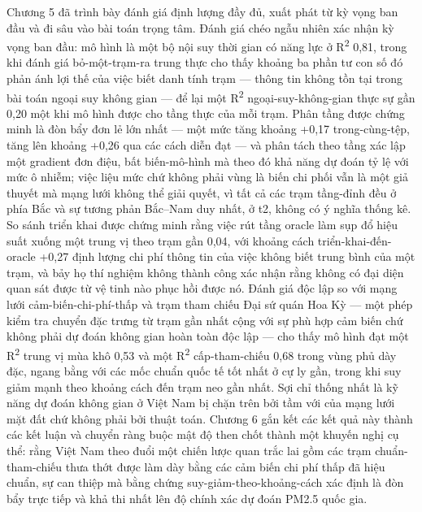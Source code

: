 Chương 5 đã trình bày đánh giá định lượng đầy đủ, xuất phát từ kỳ vọng ban đầu và đi sâu vào bài toán trọng tâm. Đánh giá chéo ngẫu nhiên xác nhận kỳ vọng ban đầu: mô hình là một bộ nội suy thời gian có năng lực ở R\textsuperscript{2} 0,81, trong khi đánh giá bỏ-một-trạm-ra trung thực cho thấy khoảng ba phần tư con số đó phản ánh lợi thế của việc biết danh tính trạm --- thông tin không tồn tại trong bài toán ngoại suy không gian --- để lại một R\textsuperscript{2} ngoại-suy-không-gian thực sự gần 0,20 một khi mô hình được cho tầng thực của mỗi trạm. Phân tầng được chứng minh là đòn bẩy đơn lẻ lớn nhất --- một mức tăng khoảng +0,17 trong-cùng-tệp, tăng lên khoảng +0,26 qua các cách diễn đạt --- và phân tách theo tầng xác lập một gradient đơn điệu, bất biến-mô-hình mà theo đó khả năng dự đoán tỷ lệ với mức ô nhiễm; việc liệu mức chứ không phải vùng là biến chi phối vẫn là một giả thuyết mà mạng lưới không thể giải quyết, vì tất cả các trạm tầng-đỉnh đều ở phía Bắc và sự tương phản Bắc--Nam duy nhất, ở t2, không có ý nghĩa thống kê. So sánh triển khai được chứng minh rằng việc rút tầng oracle làm sụp đổ hiệu suất xuống một trung vị theo trạm gần 0,04, với khoảng cách triển-khai-đến-oracle +0,27 định lượng chi phí thông tin của việc không biết trung bình của một trạm, và bảy họ thí nghiệm không thành công xác nhận rằng không có đại diện quan sát được từ vệ tinh nào phục hồi được nó. Đánh giá độc lập so với mạng lưới cảm-biến-chi-phí-thấp và trạm tham chiếu Đại sứ quán Hoa Kỳ --- một phép kiểm tra chuyển đặc trưng từ trạm gần nhất cộng với sự phù hợp cảm biến chứ không phải dự đoán không gian hoàn toàn độc lập --- cho thấy mô hình đạt một R\textsuperscript{2} trung vị mùa khô 0,53 và một R\textsuperscript{2} cấp-tham-chiếu 0,68 trong vùng phủ dày đặc, ngang bằng với các mốc chuẩn quốc tế tốt nhất ở cự ly gần, trong khi suy giảm mạnh theo khoảng cách đến trạm neo gần nhất. Sợi chỉ thống nhất là kỹ năng dự đoán không gian ở Việt Nam bị chặn trên bởi tầm với của mạng lưới mặt đất chứ không phải bởi thuật toán. Chương 6 gắn kết các kết quả này thành các kết luận và chuyển ràng buộc mật độ then chốt thành một khuyến nghị cụ thể: rằng Việt Nam theo đuổi một chiến lược quan trắc lai gồm các trạm chuẩn-tham-chiếu thưa thớt được làm dày bằng các cảm biến chi phí thấp đã hiệu chuẩn, sự can thiệp mà bằng chứng suy-giảm-theo-khoảng-cách xác định là đòn bẩy trực tiếp và khả thi nhất lên độ chính xác dự đoán PM2.5 quốc gia.

